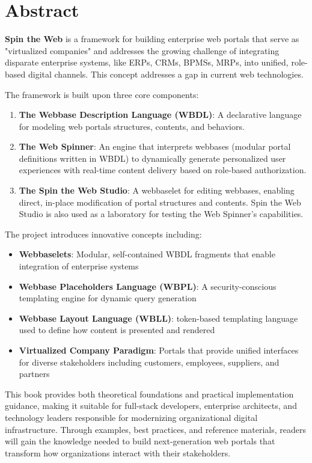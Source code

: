 
\chapter*{Abstract}

\textbf{Spin the Web} is a framework for building enterprise web portals that serve as "virtualized companies" and addresses the growing challenge of integrating disparate enterprise systems, like ERPs, CRMs, BPMSs, MRPs, into unified, role-based digital channels. This concept addresses a gap in current web technologies.

The framework is built upon three core components:

\begin{enumerate}
\item \textbf{The Webbase Description Language (WBDL)}: A declarative language for modeling web portals structures, contents, and behaviors.
\item \textbf{The Web Spinner}: An engine that interprets webbases (modular portal definitions written in WBDL) to dynamically generate personalized user experiences with real-time content delivery based on role-based authorization.
\item \textbf{The Spin the Web Studio}: A webbaselet for editing webbases, enabling direct, in-place modification of portal structures and contents. Spin the Web Studio is also used as a laboratory for testing the Web Spinner's capabilities.
\end{enumerate}

The project introduces innovative concepts including:
\begin{itemize}
\item \textbf{Webbaselets}: Modular, self-contained WBDL fragments that enable integration of enterprise systems
\item \textbf{Webbase Placeholders Language (WBPL)}: A security-conscious templating engine for dynamic query generation
\item \textbf{Webbase Layout Language (WBLL)}: token-based templating language used to define how content is presented and rendered
\item \textbf{Virtualized Company Paradigm}: Portals that provide unified interfaces for diverse stakeholders including customers, employees, suppliers, and partners
\end{itemize}

This book provides both theoretical foundations and practical implementation guidance, making it suitable for full-stack developers, enterprise architects, and technology leaders responsible for modernizing organizational digital infrastructure. Through examples, best practices, and reference materials, readers will gain the knowledge needed to build next-generation web portals that transform how organizations interact with their stakeholders.

